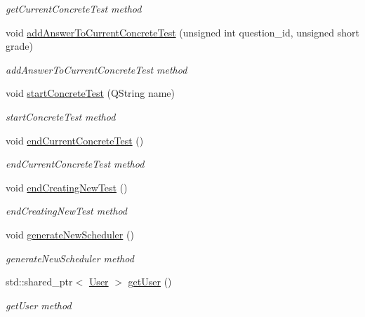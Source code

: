 \begin{DoxyCompactItemize}
\begin{DoxyCompactList}\small\item\em get\+Current\+Concrete\+Test method \end{DoxyCompactList}\item 
void \hyperlink{class_main_class_a2bc7d95eab87498c7afdaf7f34ab9a4e}{add\+Answer\+To\+Current\+Concrete\+Test} (unsigned int question\+\_\+id, unsigned short grade)
\begin{DoxyCompactList}\small\item\em add\+Answer\+To\+Current\+Concrete\+Test method \end{DoxyCompactList}\item 
void \hyperlink{class_main_class_ac50731f2e84b87ea305679ac3a8a2ac7}{start\+Concrete\+Test} (Q\+String name)
\begin{DoxyCompactList}\small\item\em start\+Concrete\+Test method \end{DoxyCompactList}\item 
void \hyperlink{class_main_class_ae738e2248a895b7248d40188bb3f1e96}{end\+Current\+Concrete\+Test} ()
\begin{DoxyCompactList}\small\item\em end\+Current\+Concrete\+Test method \end{DoxyCompactList}\item 
void \hyperlink{class_main_class_a6f4b8eaa3ac3e2bfd2665fed96a33775}{end\+Creating\+New\+Test} ()
\begin{DoxyCompactList}\small\item\em end\+Creating\+New\+Test method \end{DoxyCompactList}\item 
\mbox{\label{class_main_class_aef9e88e99b6671d61de143ac55eadbd4}} 
void \hyperlink{class_main_class_aef9e88e99b6671d61de143ac55eadbd4}{generate\+New\+Scheduler} ()
\begin{DoxyCompactList}\small\item\em generate\+New\+Scheduler method \end{DoxyCompactList}\item 
std\+::shared\+\_\+ptr$<$ \hyperlink{class_user}{User} $>$ \hyperlink{class_main_class_a3ba58a65d27df922c34de2fc6208bb31}{get\+User} ()
\begin{DoxyCompactList}\small\item\em get\+User method \end{DoxyCompactList}\end{DoxyCompactItemize}
